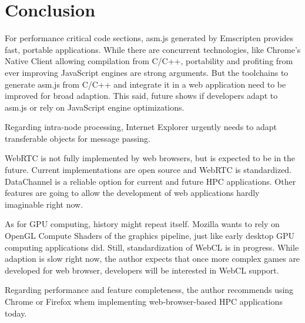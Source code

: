 \section{Conclusion} \label{chapter_conclusion}

For performance critical code sections, asm.js generated by Emscripten provides fast, portable applications. While there are concurrent technologies, like Chrome's Native Client allowing compilation from C/C++, portability and profiting from ever improving JavaScript engines are strong arguments. But the toolchains to generate asm.js from C/C++ and integrate it in a web application need to be improved for broad adaption. This said, future shows if developers adapt to asm.js or rely on JavaScript engine optimizations.

Regarding intra-node processing, Internet Explorer urgently needs to adapt transferable objects for message passing.

WebRTC is not fully implemented by web browsers, but is expected to be in the future. Current implementations are open source and WebRTC is standardized. DataChannel is a reliable option for current and future HPC applications. Other features are going to allow the development of web applications hardly imaginable right now.

As for GPU computing, history might repeat itself. Mozilla wants to rely on OpenGL Compute Shaders of the graphics pipeline, just like early desktop GPU computing applications did. Still, standardization of WebCL is in progress. While adaption is slow right now, the author expects that once more complex games are developed for web browser, developers will be interested in WebCL support.

Regarding performance and feature completeness, the author recommends using Chrome or Firefox whem implementing web-browser-based HPC applications today.
